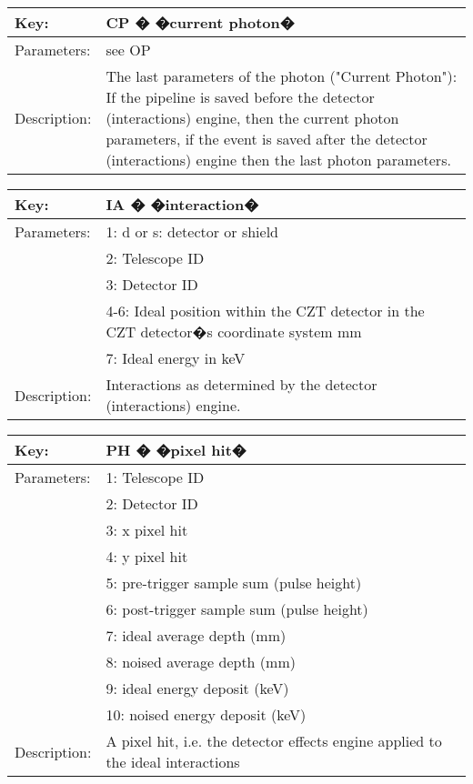 \begin{table}[htdp]
\begin{center}
\begin{tabular}{|p{2cm}|p{12cm}|}
\hline
Key:&	CP � �current photon�\\
\hline
Parameters:&	see OP\\
\hline
Description:&	The last parameters of the photon ("Current Photon"): If the pipeline
is saved before the detector (interactions) engine, then the current photon
parameters, if the event is saved after the detector (interactions) engine 
then the last photon parameters.\\
\hline
\end{tabular}
\end{center}
\end{table}

\begin{table}[htdp]
\begin{center}
\begin{tabular}{|p{2cm}|p{12cm}|}
\hline
Key:&	IA � �interaction�\\
\hline
Parameters:&	1: d or s: detector or shield\\
&2: Telescope ID\\
&3: Detector ID\\
&4-6: Ideal position within the CZT detector in the CZT detector�s coordinate system mm\\
&7: Ideal energy in keV\\
\hline
Description:&	Interactions as determined by the detector (interactions) engine.\\
\hline
\end{tabular}
\end{center}
\end{table}

\begin{table}[htdp]
\begin{center}
\begin{tabular}{|p{2cm}|p{12cm}|}
\hline
Key:&	PH � �pixel hit�\\
\hline
Parameters:&	1: Telescope ID\\
&2: Detector ID\\
&3: x pixel hit\\
&4: y pixel hit\\
&5: pre-trigger sample sum (pulse height)\\
&6: post-trigger sample sum (pulse height)\\
&7: ideal average depth (mm)\\
&8: noised average depth (mm)\\
&9: ideal energy deposit (keV)\\
&10: noised energy deposit (keV)\\
Description:&	A pixel hit, i.e. the detector effects engine applied to the ideal interactions\\
\hline
\end{tabular}
\end{center}
\end{table}

